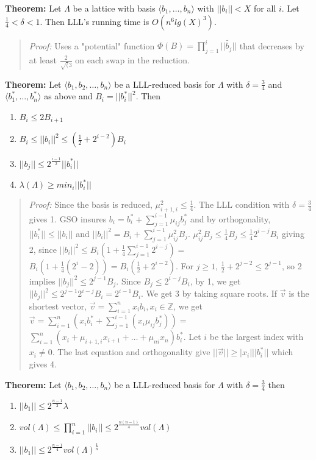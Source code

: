 {\bf Theorem: } Let $\Lambda$ be a lattice with basis $\langle b_1 , \ldots , b_n \rangle$ with
$||b_i|| < X$ for all $i$.  Let ${\frac 1 4} < \delta < 1$.  Then LLL's running time is
$O(n^6 lg(X)^3)$.
\begin{quote}
\emph{Proof:}
Uses a "potential" function $\Phi(B) = \prod_{j=1}^i ||\tilde{b_j}||$ that decreases by
at least ${\frac 2 {\sqrt(3}}$ on each swap in the reduction.
\end{quote}
{\bf Theorem: } Let $\langle b_1 , b_2 , \ldots , b_n \rangle$ be a LLL-reduced basis for $\Lambda$
with $\delta = {\frac 3 4}$ and $\langle b_1^* , \ldots , b_n^* \rangle$ as above and $B_i = ||b_i^*||^2$.
Then
\begin{enumerate}
\item $B_i \leq 2 B_{i+1}$
\item $B_i \leq ||b_i||^2 \leq ({\frac 1 2} + 2^{i-2})B_i$
\item $||b_j|| \leq 2^{\frac {i-1} 2} ||b_i^*||$
\item $\lambda(\Lambda) \geq min_i ||b_i^*||$
\end{enumerate}
\begin{quote}
\emph{Proof: }
Since the basis is reduced, $\mu_{i+1,i}^2 \leq {\frac 1 4}$. The LLL condition with $\delta = {\frac 3 4}$
gives 1.  GSO insures $b_i = b_i^* + \sum_{j=1}^{i-1} \mu_{ij}b_j^*$ and by orthogonality,
$||b_i^*|| \leq ||b_i||$ and $||b_i||^2 = B_i + \sum_{j=1}^{i-1} \mu_{ij}^2 B_j$.
$\mu_{ij}^2 B_j \leq {\frac 1 4} B_j \leq {\frac 1 4} 2^{i-j} B_i$ giving 2, since
$||b_i||^2 \leq B_i(1 + {\frac 1 4} \sum_{j=1}^{i-1} 2^{i-j}) = $
$B_i (1+ {\frac 1 4} (2^i - 2))= B_i ({\frac 1 2} + 2^{i-2})$.  For $j \geq 1$, ${\frac 1 2} + 2^{j-2} \leq 2^{j-1}$,
so 2 implies $||b_j||^2 \leq 2^{j-1} B_j$.
Since $B_j \leq 2^{i-j} B_i$, by 1, we get $||b_j||^2 \leq 2^{j-1} 2^{i-j} B_i= 2^{i-1}B_i$.
We get 3 by taking square roots.
If ${\vec v}$ is the shortest vector, ${\vec v} = \sum_{i=1}^n x_i b_i, x_i \in {\mathbb Z}$, we get
${\vec v} = \sum_{i=1}^n (x_i b_i^* + \sum_{j=1}^{i-1} (x_i \mu_{ij} b_j^*))= $
$\sum_{i=1}^n (x_i + \mu_{i+1,i} x_{i+1} + \ldots + \mu_{ni} x_n)b_i^*$.  Let $i$ be the 
largest index with $x_i \ne 0$.  The last equation and orthogonality give $||{\vec v}|| \geq |x_i| ||b_i^*||$ which gives 4.
\end{quote}
{\bf Theorem: } Let $\langle b_1 , b_2 , \ldots , b_n \rangle$ be a LLL-reduced basis for $\Lambda$
with $\delta = {\frac 3 4}$ then
\begin{enumerate}
\item $||b_1|| \leq 2^{\frac {n-1} 2} \lambda$
\item $vol(\Lambda) \leq \prod_{i=1}^n ||b_i|| \leq 2^{\frac {n(n-1)} {4}} vol(\Lambda)$
\item $||b_1|| \leq 2^{\frac {n-1} {4}} vol(\Lambda)^{\frac 1 n}$
\end{enumerate}
